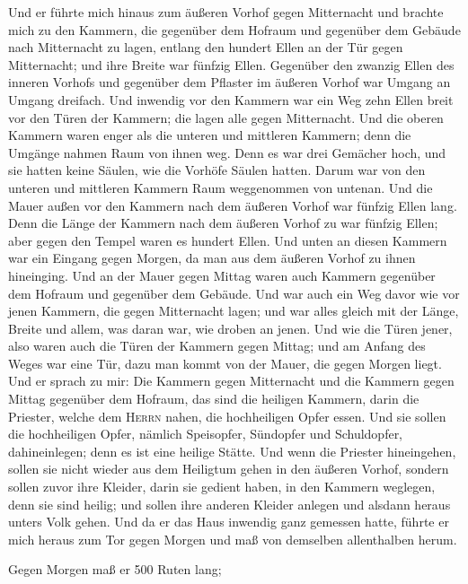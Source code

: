  Und er führte mich hinaus zum äußeren Vorhof gegen
Mitternacht und brachte mich zu den Kammern, die gegenüber dem Hofraum
und gegenüber dem Gebäude nach Mitternacht zu lagen, 
entlang den hundert Ellen an der Tür gegen Mitternacht; und ihre Breite
war fünfzig Ellen.  Gegenüber den zwanzig Ellen des
inneren Vorhofs und gegenüber dem Pflaster im äußeren Vorhof war Umgang
an Umgang dreifach.  Und inwendig vor den Kammern war ein
Weg zehn Ellen breit vor den Türen der Kammern; die lagen alle gegen
Mitternacht.  Und die oberen Kammern waren enger als die
unteren und mittleren Kammern; denn die Umgänge nahmen Raum von ihnen
weg.  Denn es war drei Gemächer hoch, und sie hatten keine
Säulen, wie die Vorhöfe Säulen hatten. Darum war von den unteren und
mittleren Kammern Raum weggenommen von untenan.  Und die
Mauer außen vor den Kammern nach dem äußeren Vorhof war fünfzig Ellen
lang.  Denn die Länge der Kammern nach dem äußeren Vorhof
zu war fünfzig Ellen; aber gegen den Tempel waren es hundert Ellen.
 Und unten an diesen Kammern war ein Eingang gegen Morgen,
da man aus dem äußeren Vorhof zu ihnen hineinging.  Und
an der Mauer gegen Mittag waren auch Kammern gegenüber dem Hofraum und
gegenüber dem Gebäude.  Und war auch ein Weg davor wie
vor jenen Kammern, die gegen Mitternacht lagen; und war alles gleich mit
der Länge, Breite und allem, was daran war, wie droben an jenen.
 Und wie die Türen jener, also waren auch die Türen der
Kammern gegen Mittag; und am Anfang des Weges war eine Tür, dazu man
kommt von der Mauer, die gegen Morgen liegt.  Und er
sprach zu mir: Die Kammern gegen Mitternacht und die Kammern gegen
Mittag gegenüber dem Hofraum, das sind die heiligen Kammern, darin die
Priester, welche dem \textsc{Herrn} nahen, die hochheiligen Opfer essen.
Und sie sollen die hochheiligen Opfer, nämlich Speisopfer, Sündopfer und
Schuldopfer, dahineinlegen; denn es ist eine heilige Stätte.
 Und wenn die Priester hineingehen, sollen sie nicht
wieder aus dem Heiligtum gehen in den äußeren Vorhof, sondern sollen
zuvor ihre Kleider, darin sie gedient haben, in den Kammern weglegen,
denn sie sind heilig; und sollen ihre anderen Kleider anlegen und
alsdann heraus unters Volk gehen.  Und da er das Haus
inwendig ganz gemessen hatte, führte er mich heraus zum Tor gegen Morgen
und maß von demselben allenthalben herum.

 Gegen Morgen maß er 500 Ruten lang;


